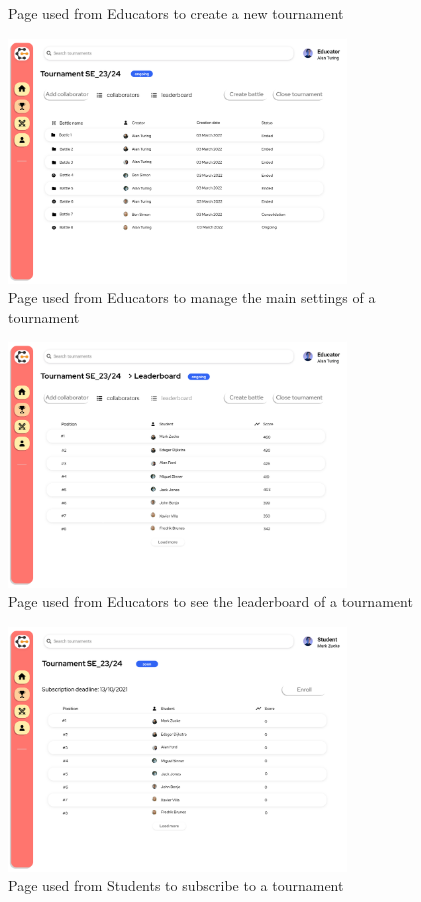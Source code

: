 \begin{enumerate}[label=\textbf{F\arabic*)}]
\begin{figure}[H]
        \caption{Page used from Educators to create a new tournament}
    \end{figure}
    \begin{figure}[H]
        \centering
        \includegraphics[width=0.8\textwidth]{Mockups/7_educator_manages_tournament.png}
        \caption{Page used from Educators to manage the main settings of a tournament}
    \end{figure}
    \begin{figure}[H]
        \centering
        \includegraphics[width=0.8\textwidth]{Mockups/8_educator_tournament_leaderboard.png}
        \caption{Page used from Educators to see the leaderboard of a tournament}
    \end{figure}
    \begin{figure}[H]
        \centering
        \includegraphics[width=0.8\textwidth]{Mockups/9_student_tournament_subscription.png}
        \caption{Page used from Students to subscribe to a tournament}
    \end{figure}


\end{enumerate}
